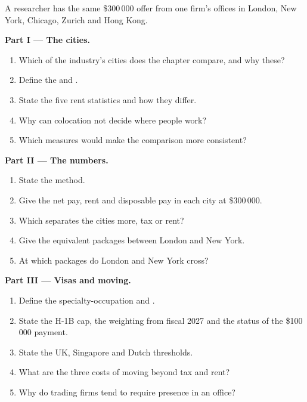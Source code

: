 \begin{problem}\label{pb:in:locations:1}
A researcher has the same \$300\,000 offer from one firm's offices in London, New York, Chicago, Zurich and Hong Kong.

\medskip\noindent\textbf{Part I --- The cities.}
\begin{enumerate}
\item Which of the industry's cities does the chapter compare, and why these?
\item Define the  and .
\item State the five rent statistics and how they differ.
\item Why can colocation not decide where people work?
\item Which measures would make the comparison more consistent?
\end{enumerate}

\medskip\noindent\textbf{Part II --- The numbers.}
\begin{enumerate}[resume]
\item State the method.
\item Give the net pay, rent and disposable pay in each city at \$300\,000.
\item Which separates the cities more, tax or rent?
\item Give the equivalent packages between London and New York.
\item At which packages do London and New York cross?
\end{enumerate}

\medskip\noindent\textbf{Part III --- Visas and moving.}
\begin{enumerate}[resume]
\item Define the specialty-occupation and .
\item State the H-1B cap, the weighting from fiscal 2027 and the status of the \$100\,000 payment.
\item State the UK, Singapore and Dutch thresholds.
\item What are the three costs of moving beyond tax and rent?
\item Why do trading firms tend to require presence in an office?
\end{enumerate}


\end{problem}
